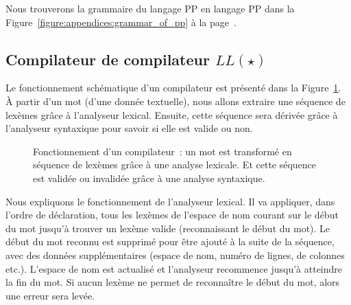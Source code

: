 Nous trouverons la grammaire du langage PP en langage PP dans la
Figure~\ref{figure:appendices:grammar_of_pp} à la
page~\pageref{figure:appendices:grammar_of_pp}.

\subsection{Compilateur de compilateur $LL(\star)$}
\label{subsection:data:compiler-compiler}

Le fonctionnement schématique d'un compilateur est présenté dans la
Figure~\ref{figure:data:compiler}. À partir d'un {\strong mot} (d'une donnée
textuelle), nous allons extraire une {\strong séquence} de lexèmes grâce à
l'analyseur {\strong lexical}. Ensuite, cette séquence sera {\strong dérivée}
grâce à l'analyseur {\strong syntaxique} pour savoir si elle est valide ou non.
%
\begin{figure}


\caption{\label{figure:data:compiler} Fonctionnement d'un compilateur~: un mot
est transformé en séquence de lexèmes grâce à une analyse lexicale. Et cette
séquence est validée ou invalidée grâce à une analyse syntaxique.}

\end{figure}

Nous expliquons le fonctionnement de l'analyseur lexical. Il va appliquer, dans
l'ordre de déclaration, tous les lexèmes de l'espace de nom courant sur le début
du mot jusqu'à trouver un lexème valide (reconnaissant le début du mot). Le
début du mot reconnu est supprimé pour être ajouté à la suite de la séquence,
avec des données supplémentaires (espace de nom, numéro de lignes, de colonnes
etc.). L'espace de nom est actualisé et l'analyseur recommence jusqu'à atteindre
la fin du mot. Si aucun lexème ne permet de reconnaître le début du mot, alors
une erreur sera levée.

